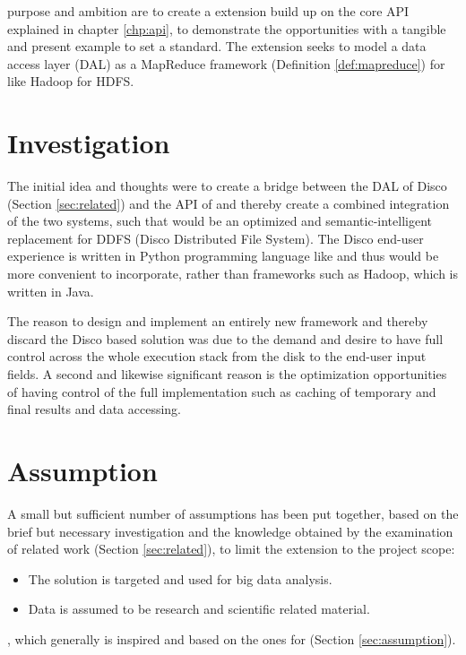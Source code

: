  purpose and ambition are to create a \CodeName extension build up on the core API explained in chapter \ref{chp:api}, to demonstrate the opportunities with a tangible and present example to set a standard. The extension seeks to model a data access layer (DAL) as a MapReduce framework (Definition \ref{def:mapreduce}) for \CodeName like Hadoop for HDFS.

\section{Investigation}
The initial idea and thoughts were to create a bridge between the DAL of Disco (Section \ref{sec:related}) and the API of \CodeName and thereby create a combined integration of the two systems, such that \CodeName would be an optimized and semantic-intelligent replacement for DDFS (Disco Distributed File System). The Disco end-user experience is written in Python programming language like \CodeName and thus would be more convenient to incorporate, rather than frameworks such as Hadoop, which is written in Java.
\newline

The reason to design and implement an entirely new framework and thereby discard the Disco based solution was due to the demand and desire to have full control across the whole execution stack from the disk to the end-user input fields. A second and likewise significant reason is the optimization opportunities of having control of the full implementation such as caching of temporary and final results and data accessing.

\section{Assumption}
A small but sufficient number of assumptions has been put together, based on the brief but necessary investigation and the knowledge obtained by the examination of related work (Section \ref{sec:related}), to limit the extension to the project scope:

\begin{itemize}
	\item The solution is targeted and used for big data analysis.	
	\item Data is assumed to be research and scientific related material. 
\end{itemize}
, which generally is inspired and based on the ones for \CodeName (Section \ref{sec:assumption}).
\newline

